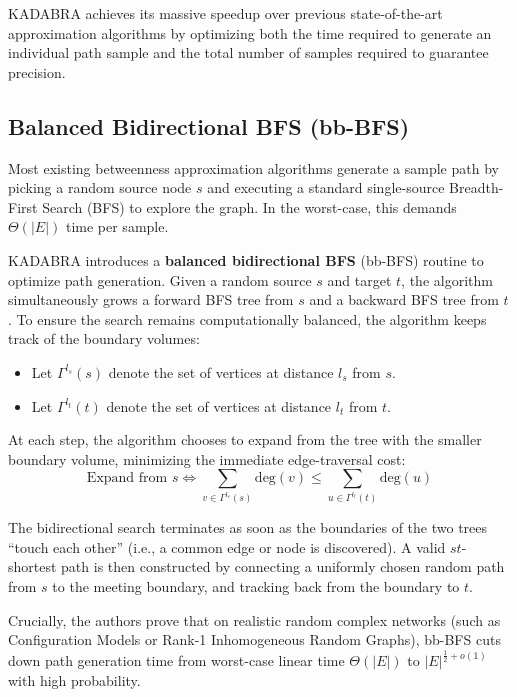 KADABRA achieves its massive speedup over previous state-of-the-art approximation algorithms by optimizing both the time required to generate an individual path sample and the total number of samples required to guarantee precision.

\subsection{Balanced Bidirectional BFS (bb-BFS)}
Most existing betweenness approximation algorithms generate a sample path by picking a random source node $s$ and executing a standard single-source Breadth-First Search (BFS) to explore the graph. In the worst-case, this demands $\Theta(|E|)$ time per sample. 

KADABRA introduces a \textbf{balanced bidirectional BFS} (bb-BFS) routine to optimize path generation. Given a random source $s$ and target $t$, the algorithm simultaneously grows a forward BFS tree from $s$ and a backward BFS tree from $t$. To ensure the search remains computationally balanced, the algorithm keeps track of the boundary volumes:
\begin{itemize}
    \item Let $\Gamma^{l_s}(s)$ denote the set of vertices at distance $l_s$ from $s$.
    \item Let $\Gamma^{l_t}(t)$ denote the set of vertices at distance $l_t$ from $t$.
\end{itemize}

At each step, the algorithm chooses to expand from the tree with the smaller boundary volume, minimizing the immediate edge-traversal cost:
\begin{equation}
\text{Expand from } s \iff \sum_{v \in \Gamma^{l_s}(s)} \text{deg}(v) \le \sum_{u \in \Gamma^{l_t}(t)} \text{deg}(u)
\end{equation}

The bidirectional search terminates as soon as the boundaries of the two trees ``touch each other'' (i.e., a common edge or node is discovered).
 A valid $st$-shortest path is then constructed by connecting a uniformly chosen random path from $s$ to the meeting boundary,
  and tracking back from the boundary to $t$. 

Crucially, the authors prove that on realistic random complex networks (such as Configuration Models or Rank-1 Inhomogeneous Random Graphs),
 bb-BFS cuts down path generation time from worst-case linear time $\Theta(|E|)$ to $|E|^{\frac{1}{2}+o(1)}$ with high probability.

